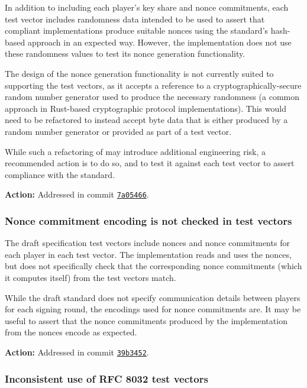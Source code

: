 \documentclass{article}
\begin{document}
In addition to including each player's key share and nonce commitments, each test vector includes randomness data intended to be used to assert that compliant implementations produce suitable nonces using the standard's hash-based approach in an expected way.
However, the implementation does not use these randomness values to test its nonce generation functionality.

The design of the nonce generation functionality is not currently suited to supporting the test vectors, as it accepts a reference to a cryptographically-secure random number generator used to produce the necessary randomness (a common approach in Rust-based cryptographic protocol implementations).
This would need to be refactored to instead accept byte data that is either produced by a random number generator or provided as part of a test vector.

While such a refactoring of may introduce additional engineering risk, a recommended action is to do so, and to test it against each test vector to assert compliance with the standard.

\textbf{Action:} Addressed in commit \href{https://github.com/serai-dex/serai/commit/7a054660496e0dbd7d7adc6e6bc8cf0891e1c83a}{\texttt{7a05466}}.


\subsubsection{Nonce commitment encoding is not checked in test vectors}

The draft specification test vectors include nonces and nonce commitments for each player in each test vector.
The implementation reads and uses the nonces, but does not specifically check that the corresponding nonce commitments (which it computes itself) from the test vectors match.

While the draft standard does not specify communication details between players for each signing round, the encodings used for nonce commitments are.
It may be useful to assert that the nonce commitments produced by the implementation from the nonces encode as expected.

\textbf{Action:} Addressed in commit \href{https://github.com/serai-dex/serai/commit/39b3452da1719696495613b928652942225e1de9}{\texttt{39b3452}}.


\subsubsection{Inconsistent use of RFC 8032 test vectors}
\end{document}
